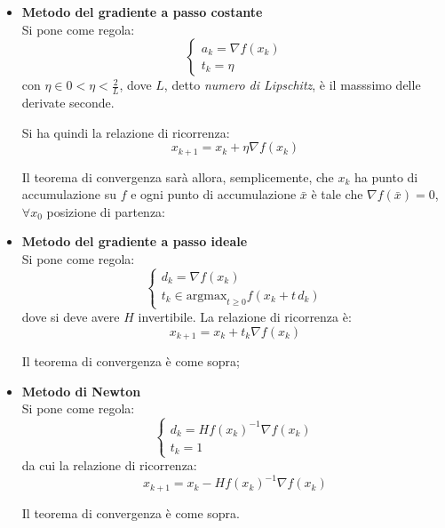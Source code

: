 \documentclass[a4paper,11pt]{article}
\begin{document}
\begin{itemize}
	\item \textsf{\textbf{Metodo del gradiente a passo costante}} \\
		Si pone come regola:
		\[
			\begin{cases}
				a_k = \nabla f (x_k) \\ 
				t_k = \eta 
			\end{cases}
		\]
		con $\eta \in 0 < \eta < \frac{2}{L}$, dove $L$, detto \textit{numero di Lipschitz}, è il masssimo delle derivate seconde.
		
		Si ha quindi la relazione di ricorrenza:
		$$
			x_{k+1} = x_k + \eta \nabla f(x_k)
		$$

		Il teorema di convergenza sarà allora, semplicemente, che $x_k$ ha punto di accumulazione su $f$ e ogni punto di accumulazione $\bar{x}$ è tale che $\nabla f(\bar{x}) = 0$, $\forall x_0$ posizione di partenza:

	\item \textsf{\textbf{Metodo del gradiente a passo ideale}} \\ 
		Si pone come regola:
		\[
			\begin{cases}
				d_k = \nabla f(x_k) \\ 
				t_k \in \mathrm{argmax}_{t \geq 0} f(x_k + t \, d_k)
			\end{cases}
		\]
		dove si deve avere $H$ invertibile.
		La relazione di ricorrenza è:
		$$
			x_{k+1} = x_k + t_k \nabla f(x_k)
		$$

		Il teorema di convergenza è come sopra;
		
	\item \textsf{\textbf{Metodo di Newton}} \\
		Si pone come regola:
		\[
			\begin{cases}
				d_k = H f(x_k)^{-1} \nabla f(x_k) \\ 
				t_k = 1
			\end{cases}
		\]
		da cui la relazione di ricorrenza:
		$$
		x_{k+1} = x_k - H f(x_k)^{-1} \nabla f(x_k)
		$$
		
		Il teorema di convergenza è come sopra.

\end{itemize}
\end{document}
